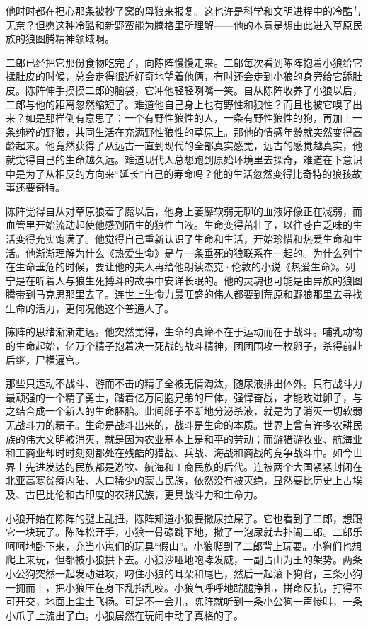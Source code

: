 \par 他时时都在担心那条被抄了窝的母狼来报复。这也许是科学和文明进程中的冷酷与无奈？但愿这种冷酷和新野蛮能为腾格里所理解——他的本意是想由此进入草原民族的狼图腾精神领域啊。
\par 二郎已经把它那份食物吃完了，向陈阵慢慢走来。二郎每次看到陈阵抱着小狼给它揉肚皮的时候，总会走得很近好奇地望着他俩，有时还会走到小狼的身旁给它舔肚皮。陈阵伸手摸摸二郎的脑袋，它冲他轻轻咧嘴一笑。自从陈阵收养了小狼以后，二郎与他的距离忽然缩短了。难道他自己身上也有野性和狼性？而且也被它嗅了出来？如是那样倒有意思了：一个有野性狼性的人，一条有野性狼性的狗，再加上一条纯粹的野狼，共同生活在充满野性狼性的草原上。那他的情感年龄就突然变得高龄起来。他竟然获得了从远古一直到现代的全部真实感觉，远古的感觉越真实，他就觉得自己的生命越久远。难道现代人总想跑到原始环境里去探奇，难道在下意识中是为了从相反的方向来“延长”自己的寿命吗？他的生活忽然变得比奇特的狼孩故事还要奇特。
\par 陈阵觉得自从对草原狼着了魔以后，他身上萎靡软弱无聊的血液好像正在减弱，而血管里开始流动起使他感到陌生的狼性血液。生命变得茁壮了，以往苍白乏味的生活变得充实饱满了。他觉得自己重新认识了生命和生活，开始珍惜和热爱生命和生活。他渐渐理解为什么《热爱生命》是与一条垂死的狼联系在一起的。为什么列宁在生命垂危的时候，要让他的夫人再给他朗读杰克·伦敦的小说《热爱生命》。列宁是在听着人与狼生死搏斗的故事中安详长眠的。他的灵魂也可能是由异族的狼图腾带到马克思那里去了。连世上生命力最旺盛的伟人都要到荒原和野狼那里去寻找生命的活力，更何况他这个普通人了。
\par 陈阵的思绪渐渐走远。他突然觉得，生命的真谛不在于运动而在于战斗。哺乳动物的生命起始，亿万个精子抱着决一死战的战斗精神，团团围攻一枚卵子，杀得前赴后继，尸横遍宫。
\par 那些只运动不战斗、游而不击的精子全被无情淘汰，随尿液排出体外。只有战斗力最顽强的一个精子勇士，踏着亿万同胞兄弟的尸体，强悍奋战，才能攻进卵子，与之结合成一个新人的生命胚胎。此间卵子不断地分泌杀液，就是为了消灭一切软弱无战斗力的精子。生命是战斗出来的，战斗是生命的本质。世界上曾有许多农耕民族的伟大文明被消灭，就是因为农业基本上是和平的劳动；而游猎游牧业、航海业和工商业却时时刻刻都处在残酷的猎战、兵战、海战和商战的竞争战斗中。如今世界上先进发达的民族都是游牧、航海和工商民族的后代。连被两个大国紧紧封闭在北亚高寒贫瘠内陆、人口稀少的蒙古民族，依然没有被灭绝，显然要比历史上古埃及、古巴比伦和古印度的农耕民族，更具战斗力和生命力。
\par 小狼开始在陈阵的腿上乱扭，陈阵知道小狼要撒尿拉屎了。它也看到了二郎，想跟它一块玩了。陈阵松开手，小狼一骨碌跳下地，撒了一泡尿就去扑闹二郎。二郎乐呵呵地卧下来，充当小崽们的玩具“假山”。小狼爬到了二郎背上玩耍。小狗们也想爬上来玩，但都被小狼拱下去。小狼沙哑地咆哮发威，一副占山为王的架势。两条小公狗突然一起发动进攻，叼住小狼的耳朵和尾巴，然后一起滚下狗背，三条小狗一拥而上，把小狼压在身下乱掐乱咬。小狼气呼呼地踹腿挣扎，拼命反抗，打得不可开交，地面上尘土飞扬。可是不一会儿，陈阵就听到一条小公狗一声惨叫，一条小爪子上流出了血。小狼居然在玩闹中动了真格的了。
